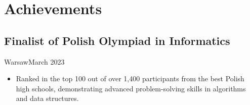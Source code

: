 \section{Achievements}
\subsection{Finalist of Polish Olympiad in Informatics}{Warsaw}{March 2023}
\begin{itemize}
    \item Ranked in the top 100 out of over 1,400 participants from the best Polish high schools, demonstrating advanced problem-solving skills in algorithms and data structures.
\end{itemize}

\vspace{1em}
